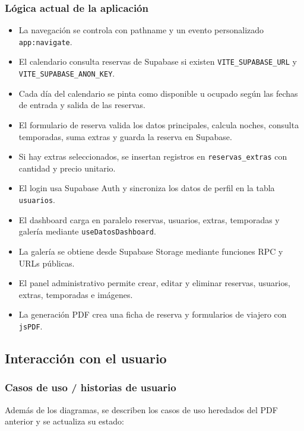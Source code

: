 \documentclass[11pt,a4paper]{article}
\begin{document}
\subsubsection{Lógica actual de la aplicación}
\begin{itemize}[leftmargin=1.4cm]
  \item La navegación se controla con pathname y un evento personalizado \texttt{app:navigate}.
  \item El calendario consulta reservas de Supabase si existen \texttt{VITE\_SUPABASE\_URL} y \texttt{VITE\_SUPABASE\_ANON\_KEY}.
  \item Cada día del calendario se pinta como disponible u ocupado según las fechas de entrada y salida de las reservas.
  \item El formulario de reserva valida los datos principales, calcula noches, consulta temporadas, suma extras y guarda la reserva en Supabase.
  \item Si hay extras seleccionados, se insertan registros en \texttt{reservas\_extras} con cantidad y precio unitario.
  \item El login usa Supabase Auth y sincroniza los datos de perfil en la tabla \texttt{usuarios}.
  \item El dashboard carga en paralelo reservas, usuarios, extras, temporadas y galería mediante \texttt{useDatosDashboard}.
  \item La galería se obtiene desde Supabase Storage mediante funciones RPC y URLs públicas.
  \item El panel administrativo permite crear, editar y eliminar reservas, usuarios, extras, temporadas e imágenes.
  \item La generación PDF crea una ficha de reserva y formularios de viajero con \texttt{jsPDF}.
\end{itemize}

\subsection{Interacción con el usuario}

\subsubsection{Casos de uso / historias de usuario}
Además de los diagramas, se describen los casos de uso heredados del PDF anterior y se actualiza su estado:
\end{document}
